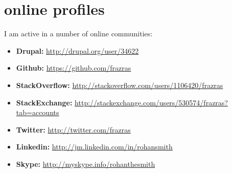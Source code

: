 \documentclass[]{friggeri-cv} %
\begin{document}

\section{online profiles}
I am active in a number of online communities:
\begin{itemize}
    \item \textbf{Drupal: }\href {http://drupal.org/user/34622}{http://drupal.org/user/34622}
    \item \textbf{Github: }\href {https://github.com/frazras}{https://github.com/frazras}
    \item \textbf{StackOverflow: }\href{http://stackoverflow.com/users/1106420/frazras}{http://stackoverflow.com/users/1106420/frazras}
    \item \textbf{StackExchange: } \href {http://stackexchange.com/users/530574/frazras?tab=accounts}{http://stackexchange.com/users/530574/frazras?tab=accounts}
    \item \textbf{Twitter: }\href {http://twitter.com/frazras}{http://twitter.com/frazras}
    \item \textbf{Linkedin: }\href {http://jm.linkedin.com/in/rohansmith}{http://jm.linkedin.com/in/rohansmith}
    \item \textbf{Skype: }\href {http://myskype.info/rohanthesmith}{http://myskype.info/rohanthesmith}
\end{itemize}



\end{document}
